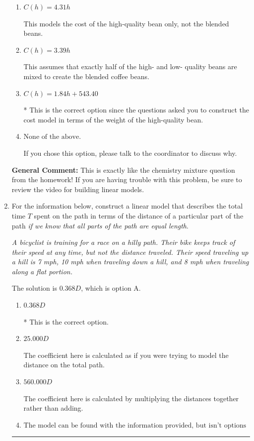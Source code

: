 \documentclass{extbook}[14pt]
\newcommand{\litem}[1]{\item #1

\rule{\textwidth}{0.4pt}}
\begin{document}
\begin{enumerate}
{\begin{enumerate}[label=\Alph*.]
This would be correct if the question asked you to construct the cost model in terms of the weight of the low-quality bean.
\item \( C(h) = 4.31 h \)

This models the cost of the high-quality bean only, not the blended beans.
\item \( C(h) = 3.39 h \)

This assumes that exactly half of the high- and low- quality beans are mixed to create the blended coffee beans.
\item \( C(h) = 1.84 h + 543.40 \)

* This is the correct option since the questions asked you to construct the cost model in terms of the weight of the high-quality bean.
\item \( \text{None of the above.} \)

If you chose this option, please talk to the coordinator to discuss why.
\end{enumerate}

\textbf{General Comment:} This is exactly like the chemistry mixture question from the homework! If you are having trouble with this problem, be sure to review the video for building linear models.
}
\litem{
For the information below, construct a linear model that describes the total time $T$ spent on the path in terms of the distance of a particular part of the path \textit{if we know that all parts of the path are equal length}.

\begin{center}
    \textit{ A bicyclist is training for a race on a hilly path. Their bike keeps track of their speed at any time, but not the distance traveled. Their speed traveling up a hill is 7 mph, 10 mph when traveling down a hill, and 8 mph when traveling along a flat portion. }
\end{center}
The solution is \( 0.368 D \), which is option A.\begin{enumerate}[label=\Alph*.]
\item \( 0.368 D \)

* This is the correct option.
\item \( 25.000 D \)

The coefficient here is calculated as if you were trying to model the distance on the total path.
\item \( 560.000 D \)

The coefficient here is calculated by multiplying the distances together rather than adding.
\item \( \text{The model can be found with the information provided, but isn't options 1-3.} \)


\end{enumerate}}
\end{enumerate}
\end{document}
